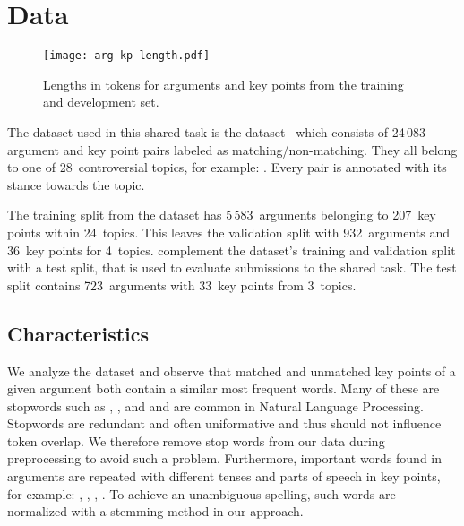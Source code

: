 \section{Data}\label{data}

\begin{figure*}
    \centering
    \texttt{[image: arg-kp-length.pdf]}
    \caption{Lengths in tokens for arguments and key points from the training and development set.}
    \label{arg-kp-length}
\end{figure*}

The dataset used in this shared task is the \ArgKP dataset~\cite{Bar-HaimEFKLS2020} which consists of 24\,083 argument 
and key point pairs labeled as matching/non-matching. They all belong to one of 28~controversial topics, for example: 
. Every pair is annotated with its stance towards the topic. 

The training split from the \ArgKP dataset has 5\,583~arguments belonging to 207~key points within 24~topics. This leaves the validation split with 932~arguments and 36~key points for 4~topics.
\citet{kpa-2021-overview} complement the \ArgKP dataset's training and validation split with a test split, that is used to evaluate submissions to the shared task. The test split contains 723~arguments with 33~key points from 3~topics.

\subsection{Characteristics}

We analyze the \ArgKP dataset and observe that matched and unmatched key points of a given argument both contain a similar most frequent words. 
Many of these are stopwords such as , , and  and are common in Natural Language Processing.
Stopwords are redundant and often uniformative and thus should not influence token overlap.
We therefore remove stop words from our data during preprocessing to avoid such a problem. 
Furthermore, important words found in arguments are repeated with different tenses and parts of speech in key points, for example: 
, , , . 
To achieve an unambiguous spelling, such words are normalized with a stemming method in our approach.

